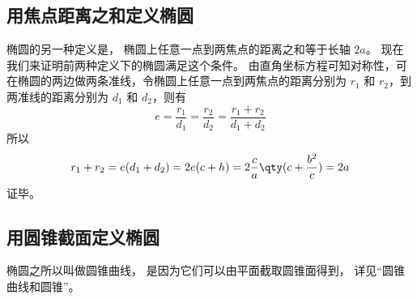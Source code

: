 \subsection{用焦点距离之和定义椭圆}
椭圆的另一种定义是， 椭圆上任意一点到两焦点的距离之和等于长轴 $2a$。 现在我们来证明前两种定义下的椭圆满足这个条件。 由直角坐标方程可知对称性，可在椭圆的两边做两条准线，令椭圆上任意一点到两焦点的距离分别为 $r_1$ 和 $r_2$，到两准线的距离分别为 $d_1$ 和 $d_2$，则有
\begin{equation}
e = \frac{r_1}{d_1} = \frac{r_2}{d_2} = \frac{r_1 + r_2}{d_1 + d_2}
\end{equation}
所以
\begin{equation}\label{eq_Elips3_9}
r_1 + r_2 = e(d_1+d_2) = 2e(c + h) = 2\frac{c}{a} \qty( c + \frac{b^2}{c} ) = 2a
\end{equation}
证毕。

\subsection{用圆锥截面定义椭圆}
椭圆之所以叫做圆锥曲线， 是因为它们可以由平面截取圆锥面得到， 详见“圆锥曲线和圆锥”。
